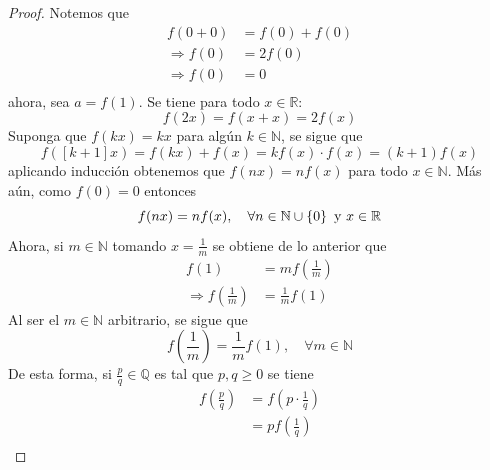 \documentclass[12pt]{article}
\begin{document}
\begin{enumerate}
    \begin{proof}
        Notemos que
        \begin{equation*}
            \begin{split}
                f(0+0)&=f(0)+f(0)\\
                \Rightarrow f(0)&=2f(0)\\
                \Rightarrow f(0)&=0\\
            \end{split}
        \end{equation*}
        ahora, sea $a=f(1)$. Se tiene para todo $x\in\mathbb{R}$:
        \begin{equation*}
            f(2x)=f(x+x)=2f(x)
        \end{equation*}
        Suponga que $f(kx)=kx$ para algún $k\in\mathbb{N}$, se sigue que
        \begin{equation*}
            f([k+1]x)=f(kx)+f(x)=kf(x)\cdot f(x)=(k+1)f(x)
        \end{equation*}
        aplicando inducción obtenemos que $f(nx)=nf(x)$ para todo $x\in\mathbb{N}$. Más aún, como $f(0)=0$ entonces
        \begin{equation*}
            f(nx)=nf(x),\quad\forall n\in\mathbb{N}\cup\left\{0 \right\}\textup{ y }x\in\mathbb{R}
        \end{equation*} 
        Ahora, si $m\in\mathbb{N}$ tomando $x=\frac{1}{m}$ se obtiene de lo anterior que
        \begin{equation*}
            \begin{split}
                f(1)&=mf\left(\frac{1}{m}\right)\\
                \Rightarrow f\left(\frac{1}{m} \right)&=\frac{1}{m}f(1)
            \end{split}
        \end{equation*}
        Al ser el $m\in\mathbb{N}$ arbitrario, se sigue que
        \begin{equation*}
            f\left(\frac{1}{m}\right)=\frac{1}{m}f(1),\quad\forall m\in\mathbb{N}
        \end{equation*}
        De esta forma, si $\frac{p}{q}\in\mathbb{Q}$ es tal que $p,q\geq 0$ se tiene
        \begin{equation*}
            \begin{split}
                f\left(\frac{p}{q}\right)&=f\left(p\cdot\frac{1}{q}\right)\\
                &=pf\left(\frac{1}{q}\right)\\

\end{split}
\end{equation*}
\end{proof}
\end{enumerate}
\end{document}
